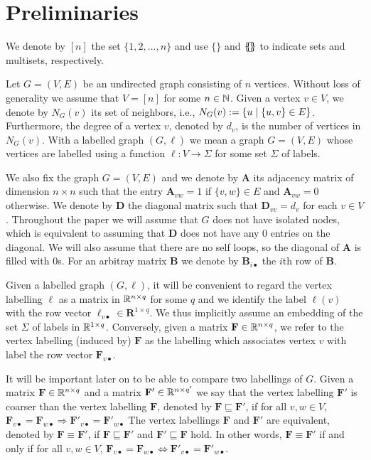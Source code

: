 \section{Preliminaries}
We denote by $[n]$ the set $\{1,2,\ldots,n\}$ and
use $\{\!\}$ and $\{\!\!\{\! \}\!\!\}$ to indicate sets and multisets, respectively.

Let $G=(V,E)$ be an undirected graph consisting of $n$ vertices. Without loss of generality we assume that $V=[n]$ for some $n\in\mathbb{N}$. Given a vertex $v\in V$, we denote by $N_G(v)$ its set of neighbors, i.e., $N_G(v):=\{u\mathrel{\mid} \{u,v\}\in E\}$. Furthermore, the degree of a vertex $v$, denoted by $d_{v}$, is the number of vertices in $N_G(v)$. With a labelled graph $(G,\pmb{\ell})$ we mean a graph $G=(V,E)$ whose vertices are labelled using a function $\pmb{\ell}:V\to \Sigma$
for some set $\Sigma$ of labels. 

We also fix the graph $G=(V,E)$ and we denote by $\mathbf{A}$ its adjacency matrix of dimension $n \times n$ such that the entry $\mathbf{A}_{vw}=1$ if $\{v,w\}\in E$ and  $\mathbf{A}_{vw}=0$ otherwise. We denote by $\mathbf{D}$ the diagonal matrix such that $\mathbf{D}_{vv}=d_v$ for each $v\in V$. Throughout the paper we will assume that $G$ does not have isolated nodes, which is equivalent to assuming that $\mathbf{D}$ does not have any $0$ entries on the diagonal. We will also assume that there are no self loops, so the diagonal of $\mathbf{A}$ is filled with $0$s. For an arbitray matrix $\mathbf{B}$ we denote by $\mathbf{B}_{i\bullet}$ the $i$th row of $\mathbf{B}$.

Given a labelled graph $(G,\pmb{\ell})$, it will be convenient to regard the vertex labelling $\pmb{\ell}$ as a matrix in $\mathbb{R}^{n\times q}$ for some $q$ and we identify the label $\pmb{\ell}(v)$ with the row vector $\pmb{\ell}_{v\bullet}\in\mathbf{R}^{1\times q}$.
We thus implicitly assume an embedding of  the set $\Sigma$ of labels in $\mathbb{R}^{1\times q}$. Conversely,
given a matrix $\mathbf{F} \in \mathbb{R}^{n \times q}$, we refer to the vertex labelling (induced by)
$\mathbf{F}$ as the labelling which associates vertex $v$ with label the row vector  $\mathbf{F}_{v\bullet}$.

It will be important later on to be able to compare two labellings of $G$.
Given a matrix $\mathbf{F} \in \mathbb{R}^{n\times q}$ and a matrix $\mathbf{F}' \in \mathbb{R}^{n\times q'}$ we say that the
vertex labelling  $\mathbf{F}'$ is coarser than the vertex labelling $\mathbf{F}$, denoted by $\mathbf{F}\sqsubseteq \mathbf{F}'$, if
for all $v,w\in V$,
$
\mathbf{F}_{v\bullet}=\mathbf{F}_{w\bullet} \Rightarrow \mathbf{F}'_{v\bullet}=\mathbf{F}'_{w\bullet}
$
The vertex labellings $\mathbf{F}$ and $\mathbf{F}'$ are equivalent, denoted by $\mathbf{F}\equiv\mathbf{F}'$, if $\mathbf{F}\sqsubseteq \mathbf{F}'$ and
$\mathbf{F}'\sqsubseteq \mathbf{F}$ hold. In other words, $\mathbf{F}\equiv\mathbf{F}'$ if and only if for all $v,w\in V$,
$
\mathbf{F}_{v\bullet}=\mathbf{F}_{w\bullet} \Leftrightarrow \mathbf{F}'_{v\bullet}=\mathbf{F}'_{w\bullet}
$.

